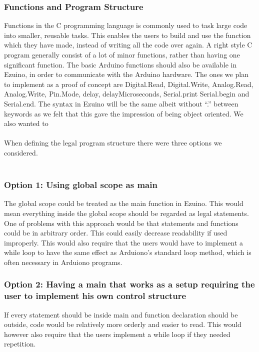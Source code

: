 \subsubsection*{Functions and Program Structure}
Functions in the C programming language is commonly used to task large code into smaller, reusable tasks. This enables the users to build and use the function which they have made, instead of writing all the code over again. A right style C program generally consist of a lot of minor functions, rather than having one significant function.
The basic Arduino functions should also be available in Ezuino, in order to communicate with the Arduino hardware. The ones we plan to implement as a proof of concept are Digital.Read, Digital.Write, Analog.Read, Analog.Write, Pin.Mode, delay, delayMicroseconds, Serial.print Serial.begin and Serial.end. The syntax in Ezuino will be the same albeit without “.” between keywords as we felt that this gave the impression of being object oriented.
We also wanted to
\\ \\
When defining the legal program structure there were three options we considered. \\ \\
\subsubsection{Option 1: Using global scope as main}
The global scope could be treated as the main function in Ezuino. This would mean everything inside the global scope should be regarded as legal statements. One of problems with this approach would be that statements and functions could be in arbitrary order. This could easily decrease readability if used improperly.
This would also require that the users would have to implement a while loop to have the same effect as Arduiono’s standard loop method, which is often necessary in Arduiono programs.


\subsubsection{Option 2: Having a main that works as a setup requiring the user to implement his own control structure}
If every statement should be inside main and function declaration should be outside, code would be relatively more orderly and easier to read.
This would however also require that the users implement a while loop if they needed repetition.


